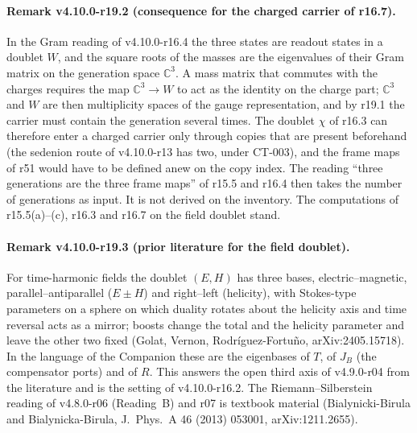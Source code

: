 \paragraph{Remark v4.10.0-r19.2 (consequence for the charged carrier of r16.7).}
In the Gram reading of v4.10.0-r16.4 the three states are readout states in a doublet \(W\), and the square roots of the masses
are the eigenvalues of their Gram matrix on the generation space \(\mathbb C^3\).  A mass matrix that commutes with the charges
requires the map \(\mathbb C^3\to W\) to act as the identity on the charge part; \(\mathbb C^3\) and \(W\) are then multiplicity
spaces of the gauge representation, and by r19.1 the carrier must contain the generation several times.  The doublet
\(\chi\) of r16.3 can therefore enter a charged carrier only through copies that are present beforehand (the sedenion route of
v4.10.0-r13 has two, under CT-003), and the frame maps of r51 would have to be defined anew on the copy index.  The
reading ``three generations are the three frame maps'' of r15.5 and r16.4 then takes the number of generations as input.
It is not derived on the inventory.  The computations of r15.5(a)--(c), r16.3 and r16.7 on the field doublet stand.

\paragraph{Remark v4.10.0-r19.3 (prior literature for the field doublet).}
For time-harmonic fields the doublet \((E,H)\) has three bases, electric--magnetic, parallel--antiparallel (\(E\pm H\)) and
right--left (helicity), with Stokes-type parameters on a sphere on which duality rotates about the helicity axis and time
reversal acts as a mirror; boosts change the total and the helicity parameter and leave the other two fixed (Golat, Vernon,
Rodr\'iguez-Fortu\~no, arXiv:2405.15718).  In the language of the Companion these are the eigenbases of \(T\), of \(J_B\) (the
compensator ports) and of \(R\).  This answers the open third axis of v4.9.0-r04 from the literature and is the setting of
v4.10.0-r16.2.  The Riemann--Silberstein reading of v4.8.0-r06 (Reading~B) and r07 is textbook material (Bialynicki-Birula and
Bialynicka-Birula, J.~Phys.~A 46 (2013) 053001, arXiv:1211.2655).

